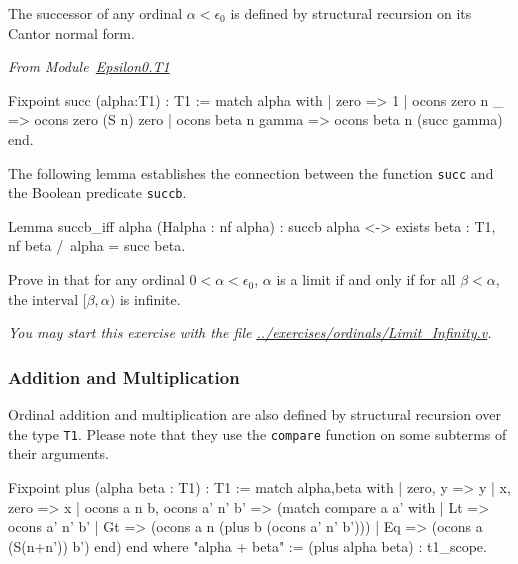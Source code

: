 
The successor of any ordinal $\alpha< \epsilon_0$ is defined by structural 
recursion on its Cantor normal form.

\label{Functions:succ-T1}

\vspace{4pt}
\emph{From Module~\href{../theories/html/hydras.Epsilon0.T1.html\#succ}{Epsilon0.T1}}

\begin{Coqsrc}
Fixpoint succ (alpha:T1) : T1 :=
  match alpha with 
   | zero => 1
   | ocons zero n _ => ocons zero (S n) zero
   | ocons beta n gamma => ocons beta n (succ gamma)
 end.
\end{Coqsrc}


The following lemma establishes the connection between the  function
\texttt{succ} and the Boolean predicate \texttt{succb}.


\begin{Coqsrc}
 Lemma succb_iff alpha (Halpha : nf alpha) :
  succb alpha <-> exists beta : T1, nf beta /\ alpha = succ  beta.
\end{Coqsrc}

 \begin{exercise}
Prove in \coq{} that for any ordinal $0< \alpha<\epsilon_0$, $\alpha$ is a limit if 
and only if for all $\beta<\alpha$, the interval $[\beta,\alpha)$ is
infinite.

\emph{You may start this exercise with the file
\url{../exercises/ordinals/Limit_Infinity.v}.}
 \end{exercise}


\subsubsection{Addition and Multiplication}

Ordinal addition and multiplication are also defined by structural recursion over the type \texttt{T1}. Please note that they use the \texttt{compare} function on some subterms of their arguments.

\label{sect:infix-plus-T1}

\begin{Coqsrc}
Fixpoint plus (alpha beta : T1) : T1 :=
  match alpha,beta with
 |  zero, y  => y
 |  x, zero  => x
 |  ocons a n b, ocons a' n' b' =>
    (match compare a a' with
     | Lt => ocons a' n' b'
     | Gt => (ocons a n (plus b (ocons a' n' b')))
     | Eq  => (ocons a (S(n+n')) b')
     end)
  end
where "alpha + beta" := (plus alpha beta) : t1_scope.
\end{Coqsrc}

